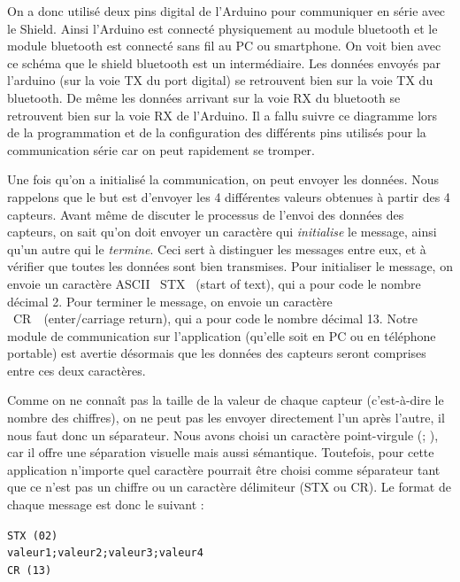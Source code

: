 \documentclass{polytech/polytech}
\begin{document}
On a donc utilisé deux pins digital de l'Arduino pour communiquer en série avec le Shield. 
Ainsi l'Arduino est connecté physiquement au module bluetooth et le module bluetooth est connecté sans fil au PC ou smartphone. 
On voit bien avec ce schéma que le shield bluetooth est un intermédiaire. 
Les données envoyés par l'arduino (sur la voie TX du port digital) se retrouvent bien sur la voie TX du bluetooth.
 De même les données arrivant sur la voie RX du bluetooth se retrouvent bien sur la voie RX de l'Arduino.
  Il a fallu suivre ce diagramme lors de la programmation et de la configuration des différents pins utilisés pour la communication série car on peut rapidement se tromper.

Une fois qu'on a initialisé la communication, on peut envoyer les données. Nous rappelons que le but est d’envoyer les 4 différentes valeurs obtenues à partir des 4 capteurs. Avant même de discuter le processus de l'envoi des données des capteurs, on sait qu'on doit envoyer un caractère qui \textit{initialise} le message, ainsi qu’un autre qui le \textit{termine}. Ceci sert à distinguer les messages entre eux, et à vérifier que toutes les données sont bien transmises. Pour initialiser le message, on envoie un caractère ASCII \guillemotleft ~STX \guillemotright\ (start of text), qui a pour code le nombre décimal 2. Pour terminer le message, on envoie un caractère \guillemotleft\ CR~\guillemotright\ (enter/carriage return), qui a pour code le nombre décimal 13. Notre module de communication sur l'application (qu'elle soit en PC ou en téléphone portable) est avertie désormais que les données des capteurs seront comprises entre ces deux caractères.

Comme on ne connaît pas la taille de la valeur de chaque capteur (c'est-à-dire le nombre des chiffres), on ne peut pas les envoyer directement l'un après l'autre, il nous faut donc un séparateur.
Nous avons choisi un caractère point-virgule (\guillemotleft ; \guillemotright), car il offre une séparation visuelle mais aussi sémantique. Toutefois, pour cette application n'importe quel caractère pourrait être choisi comme séparateur tant que ce n'est pas un chiffre ou un caractère délimiteur (STX ou CR). Le format de chaque message est donc le suivant :

\begin{center}
\texttt{STX (02)}\\
\texttt{valeur1;valeur2;valeur3;valeur4}\\
\texttt{CR (13)}
\end{center}
\end{document}

